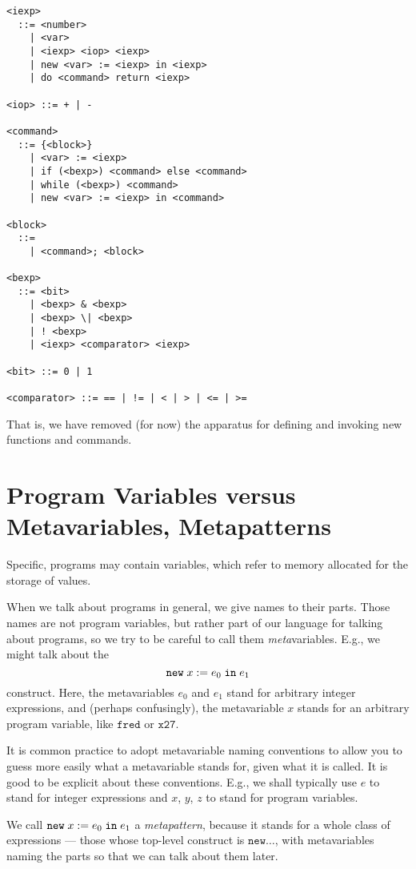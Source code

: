 \documentclass{article}
\begin{document}
\begin{verbatim}
<iexp>
  ::= <number>
    | <var>
    | <iexp> <iop> <iexp>
    | new <var> := <iexp> in <iexp>
    | do <command> return <iexp>

<iop> ::= + | -

<command>
  ::= {<block>}
    | <var> := <iexp>
    | if (<bexp>) <command> else <command>
    | while (<bexp>) <command>
    | new <var> := <iexp> in <command>

<block>
  ::=
    | <command>; <block>

<bexp>
  ::= <bit>
    | <bexp> & <bexp>
    | <bexp> \| <bexp>
    | ! <bexp>
    | <iexp> <comparator> <iexp>

<bit> ::= 0 | 1

<comparator> ::= == | != | < | > | <= | >=
\end{verbatim}

That is, we have removed (for now) the apparatus for defining and invoking new functions and commands.


\section{Program Variables versus Metavariables, Metapatterns}

Specific, programs may contain variables, which refer to memory allocated for the storage of values.

When we talk about programs in general, we give names to their parts. Those names are not program variables, but rather part of our language for talking about programs, so we try to be careful to call them \emph{meta}variables. E.g., we might talk about the
\[
  \mathtt{new}\;x\;\mathtt{:=}\;e_0\;\mathtt{in}\;e_1
\]
construct. Here, the metavariables $e_0$ and $e_1$ stand for arbitrary integer expressions, and (perhaps confusingly), the metavariable $x$ stands for an arbitrary program variable, like $\mathtt{fred}$ or $\mathtt{x27}$.

It is common practice to adopt metavariable naming conventions to allow you to guess more easily what a metavariable stands for, given what it is called. It is good to be explicit about these conventions. E.g., we shall typically use $e$ to stand for integer expressions and $x$, $y$, $z$ to stand for program variables.

We call $\mathtt{new}\;x\;\mathtt{:=}\;e_0\;\mathtt{in}\;e_1$ a \emph{metapattern}, because it stands for a whole class of expressions --- those whose top-level construct is $\mathtt{new}\ldots$, with metavariables naming the parts so that we can talk about them later.
\end{document}
